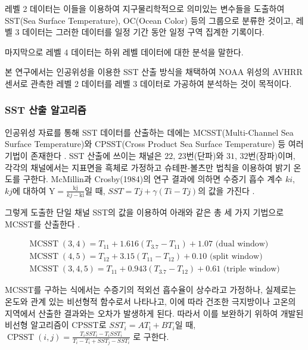 레벨 2 데이터는 이들을 이용하여 지구물리학적으로 의미있는 변수들을 도출하여 SST(Sea Surface Temperature), OC(Ocean Color) 등의 그룹으로 분류한 것이고, 레벨 3 데이터는 그러한 데이터를 일정 기간 동안 일정 구역 집계한 기록이다. 

마지막으로 레벨 4 데이터는 하위 레벨 데이터에 대한 분석을 말한다. 

본 연구에서는 인공위성을 이용한 SST 산출 방식을 채택하여 NOAA 위성의 AVHRR 센서로 관측한 레벨 2 데이터를 레벨 3 데이터로 가공하여 분석하는 것이 목적이다. 

\subsubsection{SST 산출 알고리즘}

인공위성 자료를 통해 SST 데이터를 산출하는 데에는 MCSST(Multi-Channel Sea Surface Temperature)와 CPSST(Cross Product Sea Surface Temperature) 등 여러 기법이 존재한다 \cite{박경애2004snu}. SST 산출에 쓰이는 채널은 $22$, $23$번(단파)와 $31$, $32$번(장파)이며, 각각의 채널에서는 지표면을 흑체로 가정하고 슈테판-볼츠만 법칙을 이용하여 밝기 온도를 구한다. McMillin과 Crosby(1984)의 연구 결과에 의하면 수증기 흡수 계수 $ki$, $kj$에 대하여 $\mathrm{Y}=\frac{\mathrm{kj}}{k j-\mathrm{ki}}$일 때, $
SST=T j+\gamma(T i-T j)
$의 값을 가진다 \cite{mcmillin1984theory}. 

그렇게 도출한 단일 채널 SST의 값을 이용하여 아래와 같은 총 세 가지 기법으로 MCSST를 산출한다 \cite{walton1988nonlinear}. 


\begin{equation}
	\begin{array}{l}
		\operatorname{MCSST}(3,4)=T_{11}+1.616\left(T_{3.7}-T_{11}\right)+1.07 \text { (dual window) } \\
		\operatorname{MCSST}(4,5)=T_{12}+3.15\left(T_{11}-T_{12}\right)+0.10 \text { (split window) } \\
		\operatorname{MCSST}(3,4,5)=T_{11}+0.943\left(T_{3.7}-T_{12}\right)+0.61 \text { (triple window) }
	\end{array}
\end{equation}

MCSST를 구하는 식에서는 수증기의 적외선 흡수율이 상수라고 가정하나, 실제로는 온도와 관계 있는 비선형적 함수로서 나타나고, 이에 따라 건조한 극지방이나 고온의 지역에서 산출한 결과와는 오차가 발생하게 된다. 따라서 이를 보완하기 위하여 개발된 비선형 알고리즘이 CPSST로 $S S T_{i}=A T_{\mathrm{i}}+B T_{i}$일 때, $\operatorname{CPSST}(i, j)=\frac{T_{i} S S T_{i}-T_{i} S S T_{i}}{T_{i}-T_{i}+S S T_{j}-S S T_{i}}$ 로 구한다.
